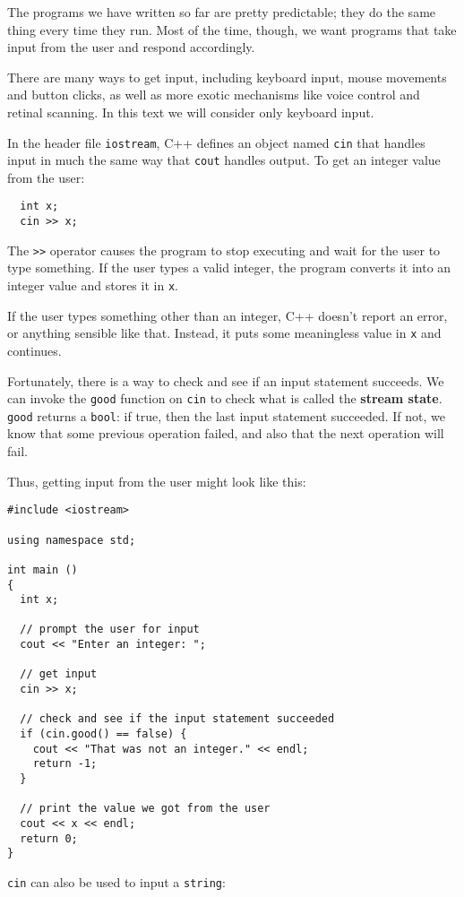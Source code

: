The programs we have written so far are pretty predictable;
they do the same thing every time they run.  Most of the time,
though, we want programs that take input from the user and
respond accordingly.

There are many ways to get input, including keyboard
input, mouse movements and button clicks, as well as more exotic
mechanisms like voice control and retinal scanning.  In this
text we will consider only keyboard input.


In the header file {\tt iostream},
C++ defines an object named {\tt cin} that handles input in
much the same way that {\tt cout} handles output.  To get an
integer value from the user:

\begin{verbatim}
  int x;
  cin >> x;
\end{verbatim}
%
The {\tt >>} operator causes the program to stop executing and
wait for the user to type something.  If the user types a valid
integer, the program converts it into an integer value and
stores it in {\tt x}.


If the user types something other than an integer,
C++ doesn't report an error, or anything sensible like that.
Instead, it puts some meaningless value in {\tt x} and continues.

Fortunately, there is a way to check and see if an input
statement succeeds.  We can invoke the {\tt good} function on
{\tt cin} to check what is called the {\bf stream state}.
{\tt good} returns a {\tt bool}: if true, then the last input
statement succeeded.  If not, we know that some previous operation
failed, and also that the next operation will fail.

Thus, getting input from the user might look like this:

\begin{verbatim}
#include <iostream>

using namespace std;

int main ()
{
  int x;

  // prompt the user for input
  cout << "Enter an integer: ";

  // get input
  cin >> x;

  // check and see if the input statement succeeded
  if (cin.good() == false) {
    cout << "That was not an integer." << endl;
    return -1;
  }

  // print the value we got from the user
  cout << x << endl;
  return 0;
}
\end{verbatim}
%
{\tt cin} can also be used to input a {\tt string}:

